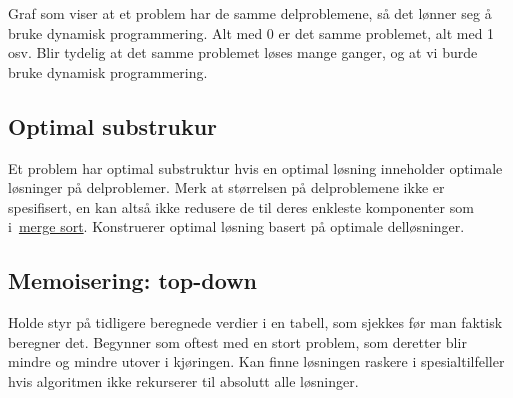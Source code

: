\documentclass[12pt]{report}
\begin{document}

Graf som viser at et problem har de samme delproblemene, så det lønner seg å bruke dynamisk programmering. Alt med 0 er det samme problemet, alt med 1 osv. Blir tydelig at det samme problemet løses mange ganger, og at vi burde bruke dynamisk programmering. \par


\vspace{\baselineskip}

\vspace{\baselineskip}

\vspace{\baselineskip}

\vspace{\baselineskip}

\vspace{\baselineskip}

\vspace{\baselineskip}

\vspace{\baselineskip}

\vspace{\baselineskip}

\vspace{\baselineskip}

\vspace{\baselineskip}
\setlength{\parskip}{6.0pt}
\subsection*{Optimal substrukur}
\setlength{\parskip}{0.0pt}
Et problem har optimal substruktur hvis en optimal løsning inneholder optimale løsninger på delproblemer. Merk at størrelsen på delproblemene ikke er spesifisert, en kan altså ikke redusere de til deres enkleste komponenter som i \href{https://www.wikipendium.no/TDT4120_Algoritmer_og_datastrukturer/nb/}{\textcolor[HTML]{006699}{merge sort}}. Konstruerer optimal løsning basert på optimale delløsninger.\par


\vspace{\baselineskip}
\subsection*{Memoisering: top-down}
Holde styr på tidligere beregnede verdier i en tabell, som sjekkes før man faktisk beregner det. Begynner som oftest med en stort problem, som deretter blir mindre og mindre utover i kjøringen. Kan finne løsningen raskere i spesialtilfeller hvis algoritmen ikke rekurserer til absolutt alle løsninger. \par
\end{document}
